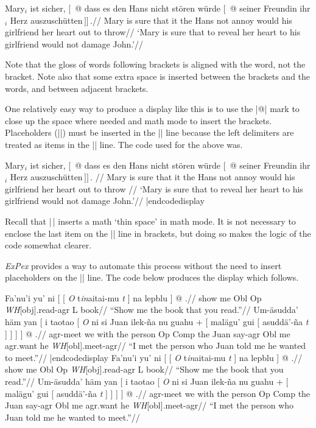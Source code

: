\framedisplay
\ex[glstyle=wrap]
\begingl
\gla Mary$_i$ ist sicher, $[\,$ @ dass es den Hans nicht st\"oren
w\"urde $[\,$ @ seiner Freundin ihr$_i$ Herz auszusch\"utten$\,]]\,.$//
\glb Mary is sure {} that it the Hans not annoy would
{} his girlfriend her heart {out to throw}//
\glft `Mary is sure that to reveal her heart to his girlfriend
would not damage John.'//
\endgl
\xe
\endframedisplay
\smallskip

\noindent Note that the gloss of words following brackets is
aligned with the word, not the bracket.  Note also that some
extra space is inserted between the brackets and the words, and
between adjacent brackets.

One relatively easy way to produce a display like this is to use
the |@| mark to close up the space where needed and math mode to
insert the brackets.  Placeholders (|{}|) must be inserted in the
|\glb| line because the left delimiters are treated as items in
the |\gla| line.  The code used for the above was.

\codedisplay
\ex[glstyle=wrap]
\begingl
\gla Mary$_i$ ist sicher, $[\,$ @ dass es den Hans nicht st\"oren
w\"urde $[\,$ @ seiner Freundin ihr$_i$ Herz
{auszusch\"utten$\,]]\,.$} //
\glb Mary is sure {} that it the Hans not annoy would {} his
girlfriend her heart {out to throw} //
\glft `Mary is sure that to reveal her heart to his girlfriend
would not damage John.'//
\endgl
\xe
|endcodedisplay

\noindent Recall that |\,| inserts a math `thin space' in math
mode. It is not necessary to enclose the last item on the |\gla|
line in brackets, but doing so makes the logic of the code
somewhat clearer.

{\it ExPex\/} provides a way to automate this process without the
need to insert placeholders on the |\glb| line. The code below
produces the display which follows.

\codedisplay
\pex[glstyle=wrap,everygla=,nopreamble]
\a \begingl       %
\gla Fa'nu'i yu' ni [ [ {\it O} t{\it in\/}aitai-mu {\it t\/} ] na
lepblu ] @ .//
\glb show me Obl Op {\it WH\/}[obj].read-agr {} L book//
\glft ``Show me the book that you read.''//
\endgl
\a \begingl       %
\gla Um-\"asudda' h\"am yan [ i taotao [ {\it O\/} ni si Juan
ilek-\~na nu guahu + [ mal\"agu' gui [ asudd\"a'-\~na {\it
t\/} ] ] ] ] @ .//
\glb agr-meet we with the person Op Comp the Juan say-agr Obl me
agr.want he {\it WH\/}[obl].meet-agr//
\glft ``I met the person who Juan told me he wanted to meet.''//
\endgl
\xe
|endcodedisplay
\framedisplay
\pex[glstyle=wrap,everygla=,nopreamble]
\a \begingl       %
\gla Fa'nu'i yu' ni [ [ {\it O} t{\it in\/}aitai-mu {\it t\/} ] na
lepblu ] @ .//
\glb show me Obl Op {\it WH\/}[obj].read-agr {} L book//
\glft ``Show me the book that you read.''//
\endgl
\a \begingl       %
\gla Um-\"asudda' h\"am yan [ i taotao [ {\it O\/} ni si Juan
ilek-\~na nu guahu + [ mal\"agu' gui [ asudd\"a'-\~na {\it
t\/} ] ] ] ] @ .//
\glb agr-meet we with the person Op Comp the Juan say-agr Obl me
agr.want he {\it WH\/}[obl].meet-agr//
\glft ``I met the person who Juan told me he wanted to meet.''//
\endgl
\xe
\endframedisplay

